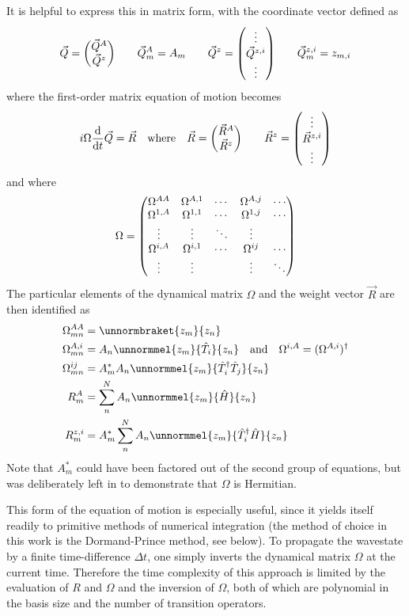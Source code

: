 It is helpful to express this in matrix form, with the coordinate vector defined as
\begin{equation}
\vec{Q}=\mqty(\vec{Q}^A\\\vec{Q}^z) \qquad \vec{Q}^A_m=A_m \qquad \vec{Q}^z=\mqty(\vdots\\\vec{Q}^{z,i}\\\vdots) \qquad \vec{Q}^{z,i}_m=z_{m,i}
\end{equation}
where the first-order matrix equation of motion becomes
\begin{equation}
i\Omega\dv{t}\vec{Q}=\vec{R} \qq{where} \vec{R}=\mqty(\vec{R}^A\\\vec{R}^z) \qquad \vec{R}^z=\mqty(\vdots\\\vec{R}^{z,i}\\\vdots)
\end{equation}
and where
\begin{equation} \label{eq:dynamical_matrix}
\Omega = \mqty(
	\Omega^{AA} & \Omega^{A,1} & \cdots & \Omega^{A,j} & \cdots\\
	\Omega^{1,A} & \Omega^{1,1} & \cdots & \Omega^{1,j} & \cdots\\
	\vdots & \vdots & \ddots & \vdots &\\
	\Omega^{i,A} & \Omega^{i,1} & \cdots & \Omega^{ij} & \cdots\\
	\vdots & \vdots & & \vdots & \ddots
)
\end{equation}
The particular elements of the dynamical matrix $\Omega$ and the weight vector $\vec{R}$ are then identified as
\begin{align}
\Omega^{AA}_{mn} &= \unnormbraket{z_m}{z_n}\\
\Omega^{A,i}_{mn} &= A_n\unnormmel{z_m}{\hat{T}_i}{z_n}\qq{and} \Omega^{i,A}=(\Omega^{A,i})\hc\\
\Omega^{ij}_{mn} &= A_m^*A_n\unnormmel{z_m}{\hat{T}_i\hc \hat{T}_j}{z_n}\\
R^A_m &= \sum_n^N A_n\unnormmel{z_m}{\hat{H}}{z_n}\\
R^{z,i}_m &= A_m^*\sum_n^N A_n \unnormmel{z_m}{\hat{T}_i\hc \hat{H}}{z_n}
\end{align}
Note that $A_m^*$ could have been factored out of the second group of equations, but was deliberately left in to demonstrate that $\Omega$ is Hermitian.

This form of the equation of motion is especially useful, since it yields itself readily to primitive methods of numerical integration (the method of choice in this work is the Dormand-Prince method, see below). To propagate the wavestate by a finite time-difference $\Delta t$, one simply inverts the dynamical matrix $\Omega$ at the current time. Therefore the time complexity of this approach is limited by the evaluation of $R$ and $\Omega$ and the inversion of $\Omega$, both of which are polynomial in the basis size and the number of transition operators.

